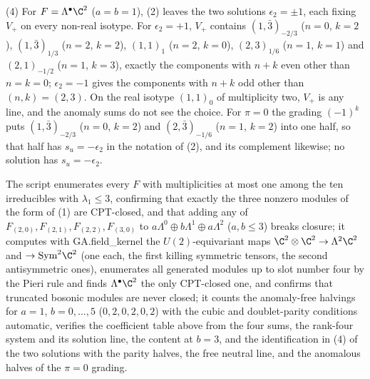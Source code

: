 (4) For $F = \Lambda^{\bullet}\C^{2}$ ($a = b = 1$), (2) leaves the two solutions $\epsilon_{2} = \pm1$, each fixing $V_{+}$ on every non-real isotype. For $\epsilon_{2} = +1$, $V_{+}$ contains $(1,\bar{3})_{-2/3}$ ($n = 0$, $k = 2$), $(1,\bar{3})_{1/3}$ ($n = 2$, $k = 2$), $(1,1)_{1}$ ($n = 2$, $k = 0$), $(2,3)_{1/6}$ ($n = 1$, $k = 1$) and $(2,1)_{-1/2}$ ($n = 1$, $k = 3$), exactly the components with $n + k$ even other than $n = k = 0$; $\epsilon_{2} = -1$ gives the components with $n + k$ odd other than $(n, k) = (2, 3)$. On the real isotype $(1,1)_{0}$ of multiplicity two, $V_{+}$ is any line, and the anomaly sums do not see the choice. For $\pi = 0$ the grading $(-1)^{k}$ puts $(1,\bar{3})_{-2/3}$ ($n = 0$, $k = 2$) and $(2,\bar{3})_{-1/6}$ ($n = 1$, $k = 2$) into one half, so that half has $s_{u} = -\epsilon_{2}$ in the notation of (2), and its complement likewise; no solution has $s_{u} = -\epsilon_{2}$.

The script enumerates every $F$ with multiplicities at most one among the ten irreducibles with $\lambda_{1} \le 3$, confirming that exactly the three nonzero modules of the form of (1) are CPT-closed, and that adding any of $F_{(2,0)}, F_{(2,1)}, F_{(2,2)}, F_{(3,0)}$ to $a\Lambda^{0} \oplus b\Lambda^{1} \oplus a\Lambda^{2}$ ($a, b \le 3$) breaks closure; it computes with GA.field_kernel the $U(2)$-equivariant maps $\C^{2} \otimes \C^{2} \to \Lambda^{2}\C^{2}$ and $\to \mathrm{Sym}^{2}\C^{2}$ (one each, the first killing symmetric tensors, the second antisymmetric ones), enumerates all generated modules up to slot number four by the Pieri rule and finds $\Lambda^{\bullet}\C^{2}$ the only CPT-closed one, and confirms that truncated bosonic modules are never closed; it counts the anomaly-free halvings for $a = 1$, $b = 0, \ldots, 5$ ($0, 2, 0, 2, 0, 2$) with the cubic and doublet-parity conditions automatic, verifies the coefficient table above from the four sums, the rank-four system and its solution line, the content at $b = 3$, and the identification in (4) of the two solutions with the parity halves, the free neutral line, and the anomalous halves of the $\pi = 0$ grading.

